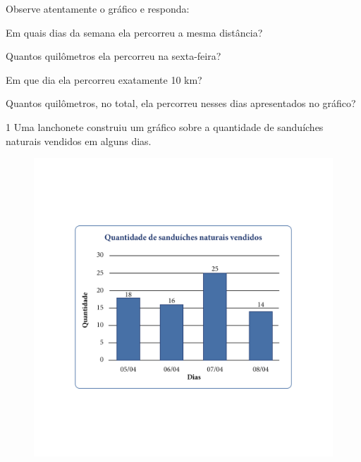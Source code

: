Observe atentamente o gráfico e responda:

\begin{escolha}
\item
  Em quais dias da semana ela percorreu a mesma distância?


\item
  Quantos quilômetros ela percorreu na sexta-feira?


\item
  Em que dia ela percorreu exatamente 10 km?


\item
  Quantos quilômetros, no total, ela percorreu nesses dias apresentados no gráfico?

\end{escolha}



\num{1} Uma lanchonete construiu um gráfico sobre a quantidade de
sanduíches naturais vendidos em alguns dias.

\begin{figure}[htpb!]
\includegraphics[width=\textwidth]{../ilustracoes/MAT5/SAEB_5ANO_MAT_figura64.png}
\end{figure}

